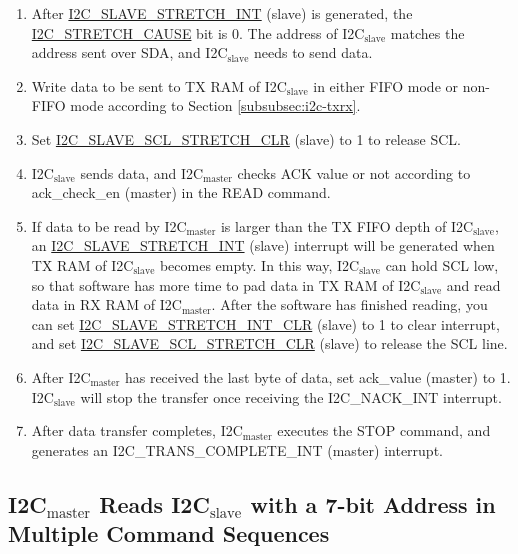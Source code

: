 \documentclass[main\_\_EN.tex]{subfiles}
\begin{document}
\begin{enumerate}
\item After \hyperref[int:i2c-slave-stretch]{I2C\_SLAVE\_STRETCH\_INT} (slave) is generated, the \hyperref[fielddesc:I2CSTRETCHCAUSE]{I2C\_STRETCH\_CAUSE} bit is 0. The address of I2C$_\text{slave}$ matches the address sent over SDA, and I2C$_\text{slave}$ needs to send data.

\item Write data to be sent to TX RAM of I2C$_\text{slave}$ in either FIFO mode or non-FIFO mode according to Section \ref{subsubsec:i2c-txrx}.
\item Set \hyperref[fielddesc:I2CSLAVESCLSTRETCHCLR]{I2C\_SLAVE\_SCL\_STRETCH\_CLR} (slave) to 1 to release SCL.


\item I2C$_\text{slave}$ sends data, and I2C$_\text{master}$ checks ACK value or not according to ack\_check\_en (master) in the READ command.
\item If data to be read by I2C$_\text{master}$ is larger than the TX FIFO depth of I2C$_\text{slave}$, an \hyperref[int:i2c-slave-stretch]{I2C\_SLAVE\_STRETCH\_INT} (slave) interrupt will be generated when TX RAM of I2C$_\text{slave}$ becomes empty. In this way, I2C$_\text{slave}$ can hold SCL low, so that software has more time to pad data in TX RAM of I2C$_\text{slave}$ and read data in RX RAM of I2C$_\text{master}$. After the software has finished reading, you can set \hyperref[fielddesc:I2CSLAVESTRETCHINTCLR]{I2C\_SLAVE\_STRETCH\_INT\_CLR} (slave) to 1 to clear interrupt, and set \hyperref[fielddesc:I2CSLAVESCLSTRETCHCLR]{I2C\_SLAVE\_SCL\_STRETCH\_CLR} (slave) to release the SCL line.

\item After I2C$_\text{master}$ has received the last byte of data, set ack\_value (master) to 1. I2C$_\text{slave}$ will stop the transfer once receiving the I2C\_NACK\_INT interrupt.

\item After data transfer completes, I2C$_\text{master}$ executes the STOP command, and generates an I2C\_TRANS\_COMPLETE\_INT (master) interrupt.
\end{enumerate}





\subsection{\texorpdfstring{I2C$_\text{master}$ Reads I2C$_\text{slave}$ with a 7-bit Address in Multiple Command Sequences}{I2C master Reads I2C slave with a 7-bit Address in Multiple Command Sequences}}
\end{document}
